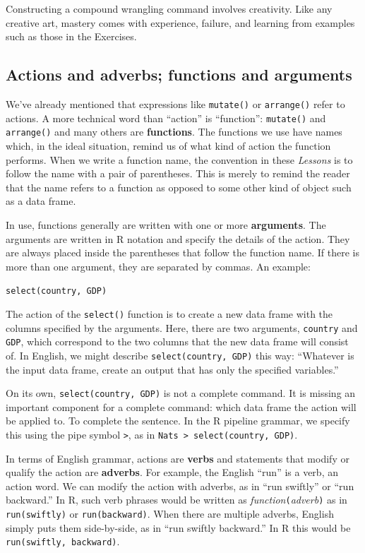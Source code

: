 \documentclass[
  letterpaper,
  DIV=11,
  numbers=noendperiod,
  oneside]{scrartcl}
\begin{document}
Constructing a compound wrangling command involves creativity. Like any
creative art, mastery comes with experience, failure, and learning from
examples such as those in the Exercises.

\subsection{Actions and adverbs; functions and
arguments}\label{actions-and-adverbs-functions-and-arguments}

We've already mentioned that expressions like \texttt{mutate()} or
\texttt{arrange()} refer to actions. A more technical word than
``action'' is ``function'': \texttt{mutate()} and \texttt{arrange()} and
many others are \textbf{functions}. The functions we use have names
which, in the ideal situation, remind us of what kind of action the
function performs. When we write a function name, the convention in
these \emph{Lessons} is to follow the name with a pair of parentheses.
This is merely to remind the reader that the name refers to a function
as opposed to some other kind of object such as a data frame.

In use, functions generally are written with one or more
\textbf{arguments}. The arguments are written in R notation and specify
the details of the action. They are always placed inside the parentheses
that follow the function name. If there is more than one argument, they
are separated by commas. An example:

\texttt{select(country,\ GDP)}

The action of the \texttt{select()} function is to create a new data
frame with the columns specified by the arguments. Here, there are two
arguments, \texttt{country} and \texttt{GDP}, which correspond to the
two columns that the new data frame will consist of. In English, we
might describe \texttt{select(country,\ GDP)} this way: ``Whatever is
the input data frame, create an output that has only the specified
variables.''

On its own, \texttt{select(country,\ GDP)} is not a complete command. It
is missing an important component for a complete command: which data
frame the action will be applied to. To complete the sentence. In the R
pipeline grammar, we specify this using the pipe symbol
\texttt{\textbar{}\textgreater{}}, as in
\texttt{Nats\ \textbar{}\textgreater{}\ select(country,\ GDP)}.

In terms of English grammar, actions are \textbf{verbs} and statements
that modify or qualify the action are \textbf{adverbs}. For example, the
English ``run'' is a verb, an action word. We can modify the action with
adverbs, as in ``run swiftly'' or ``run backward.'' In R, such verb
phrases would be written as
\emph{function}\texttt{(}\emph{adverb}\texttt{)} as in
\texttt{run(swiftly)} or \texttt{run(backward)}. When there are multiple
adverbs, English simply puts them side-by-side, as in ``run swiftly
backward.'' In R this would be \texttt{run(swiftly,\ backward)}.
\end{document}
